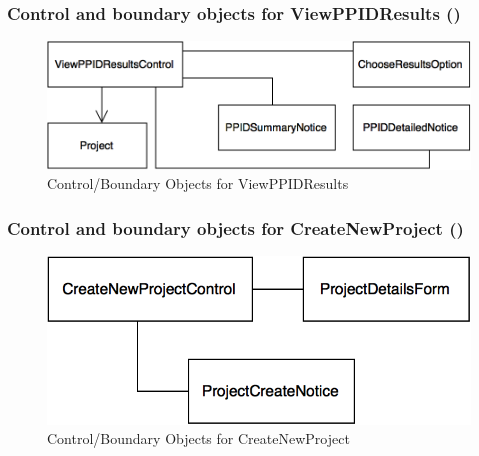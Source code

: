 \documentclass[12pt,letterpaper]{article}
\begin{document}

\subsubsection*{Control and boundary objects for ViewPPIDResults (\viewppidresults{})}

\begin{figure}[H]
	\centering{}
	\includegraphics[scale=0.4]{imgs/cbod/view-ppid-results.png}
	\caption{Control/Boundary Objects for ViewPPIDResults}
\end{figure}

\subsubsection*{Control and boundary objects for CreateNewProject (\createnewproject{})}

\begin{figure}[H]
	\centering{}
	\includegraphics[scale=0.4]{imgs/cbod/create-new-project.png}
	\caption{Control/Boundary Objects for CreateNewProject}
\end{figure}
\end{document}
